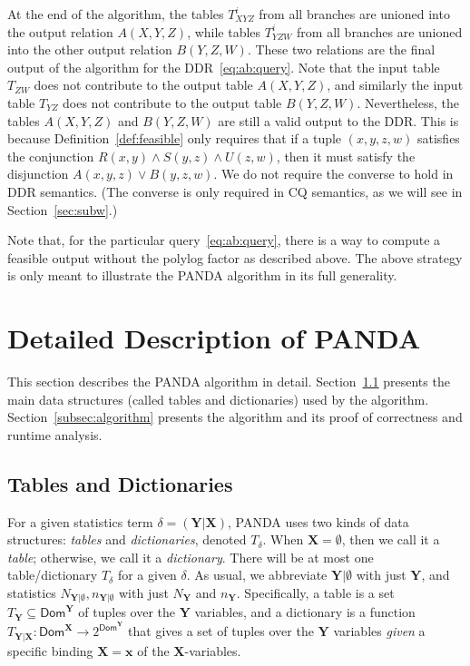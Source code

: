 \documentclass{theoretics}
\newcommand{\dom}{\textsf{Dom}}
\newcommand{\panda}{\textsf{PANDA}\xspace}
\begin{document}
At the end of the algorithm, the tables $T^i_{XYZ}$ from all branches are unioned into the
output relation $A(X, Y, Z)$, while tables $T^i_{YZW}$ from all branches are unioned into the
other output relation $B(Y, Z, W)$. These two relations are the final output of the
algorithm for the DDR~\eqref{eq:ab:query}.
Note that the input table $T_{ZW}$ does not contribute to the output table $A(X,Y,Z)$, and similarly the input table $T_{YZ}$ does not contribute to the output table $B(Y,Z,W)$.
Nevertheless, the tables $A(X,Y,Z)$ and $B(Y,Z,W)$ are still a valid output to the DDR. This is because Definition~\ref{def:feasible} only requires that if a tuple $(x, y, z, w)$ satisfies the conjunction $R(x,y) \wedge S(y,z) \wedge U(z,w)$, then it must satisfy the disjunction $A(x,y,z) \vee B(y,z,w)$.
We do not require the converse to hold in DDR semantics. (The converse is only required in CQ semantics, as we will see in Section~\ref{sec:subw}.)

Note that, for the particular query~\eqref{eq:ab:query}, there is a way to compute a
feasible output without the polylog factor as described above. The above strategy is only
meant to illustrate the \panda algorithm in its full generality.


\section{Detailed Description of \panda}
\label{sec:algorithm}

This section describes the \panda algorithm in detail.
Section~\ref{subsec:tables:dictionaries} presents the main data structures (called tables
and dictionaries) used by the algorithm. Section~\ref{subsec:algorithm} presents the
algorithm and its proof of correctness and runtime analysis.

\subsection{Tables and Dictionaries}
\label{subsec:tables:dictionaries}

For a given statistics term $\delta = (\bm Y | \bm X)$, \panda uses two kinds of data
structures: {\em tables} and {\em dictionaries}, denoted $T_\delta$.  When $\bm
X=\emptyset$, then we call it a {\em table}; otherwise, we call it a {\em dictionary}.
There will be at most one table/dictionary $T_\delta$ for a given $\delta$. As usual, we
abbreviate $\bm Y|\emptyset$ with just $\bm Y$, and statistics
$N_{\bm Y|\emptyset}, n_{\bm Y|\emptyset}$
with just $N_{\bm Y}$ and $n_{\bm Y}$.
Specifically, a table is a set $T_{\bm Y} \subseteq \dom^{\bm Y}$ of tuples over the $\bm Y$ variables,
and a dictionary is a function $T_{\bm Y|\bm X} : \dom^{\bm X} \rightarrow 2^{\dom^{\bm Y}}$
that gives a set of tuples over the $\bm Y$ variables {\em given} a specific binding
$\bm X =\bm x$ of the $\bm X$-variables.
\end{document}
